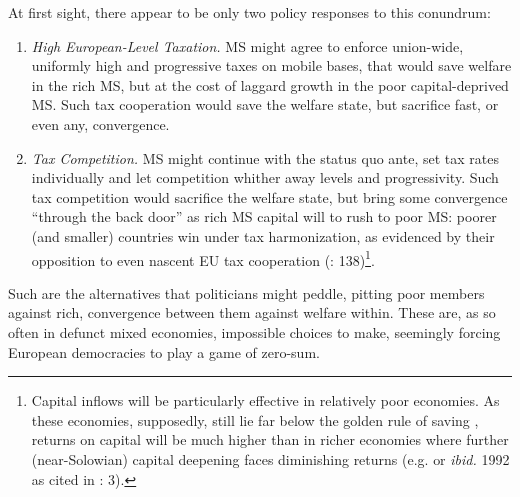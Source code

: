 \documentclass[11pt,a4paper,oneside,openright]{article}
\begin{document}
At first sight, there appear to be only two policy responses to this conundrum:
\begin{enumerate}
	\item \emph{High European-Level Taxation.} \gls{MS} might agree to enforce union-wide, uniformly high and progressive taxes on mobile bases, that would save welfare in the rich \gls{MS}, but at the cost of laggard growth in the poor capital-deprived \gls{MS}. Such tax cooperation would save the welfare state, but sacrifice fast, or even any, convergence.
	\item \emph{Tax Competition.} \gls{MS} might continue with the status quo ante, set tax rates individually and let competition whither away levels and progressivity. Such tax competition would sacrifice the welfare state, but bring some convergence ``through the back door'' as rich \gls{MS} capital will to rush to poor \gls{MS}: poorer (and smaller) countries win under tax harmonization, as evidenced by their opposition to even nascent \gls{EU} tax cooperation (\citealt{Kellermann2009}: 138)\footnote{
		Capital inflows will be particularly effective in relatively poor economies. As these economies, supposedly, still lie far below the golden rule of saving \citep{Solow1956}, returns on capital will be much higher than in richer economies where further (near-Solowian) capital deepening faces diminishing returns (e.g. \citealt{Barro1995} or \emph{ibid.} 1992 as cited in \citealt{Beckfield2009}: 3).}.
\end{enumerate}

Such are the alternatives that politicians might peddle, pitting poor members against rich, convergence between them against welfare within. These are, as so often in defunct mixed economies, impossible choices to make, seemingly forcing European democracies to play a game of zero-sum.
\end{document}
